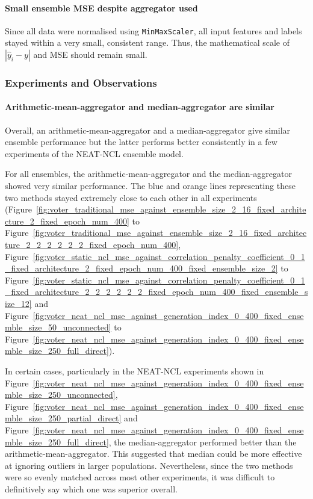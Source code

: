 \paragraph{Small ensemble MSE despite aggregator used}
Since all data were normalised using \texttt{MinMaxScaler}, all input features and labels stayed within a very small, consistent range. Thus, the mathematical scale of $\left|\hat{y}_i - y\right|$ and MSE should remain small. 


\subsubsection{Experiments and Observations}
\label{subsubsec:evaluation_voter_observations}
\paragraph{Arithmetic-mean-aggregator and median-aggregator are similar}
Overall, an arithmetic-mean-aggregator and a median-aggregator give similar ensemble performance but the latter performs better consistently in a few experiments of the NEAT-NCL ensemble model. 

For all ensembles, the arithmetic-mean-aggregator and the median-aggregator showed very similar performance. The blue and orange lines representing these two methods stayed extremely close to each other in all experiments (Figure~\ref{fig:voter_traditional_mse_against_ensemble_size_2_16_fixed_architecture_2_fixed_epoch_num_400} to Figure~\ref{fig:voter_traditional_mse_against_ensemble_size_2_16_fixed_architecture_2_2_2_2_2_2_fixed_epoch_num_400}, Figure~\ref{fig:voter_static_ncl_mse_against_correlation_penalty_coefficient_0_1_fixed_architecture_2_fixed_epoch_num_400_fixed_ensemble_size_2} to Figure~\ref{fig:voter_static_ncl_mse_against_correlation_penalty_coefficient_0_1_fixed_architecture_2_2_2_2_2_2_fixed_epoch_num_400_fixed_ensemble_size_12} and Figure~\ref{fig:voter_neat_ncl_mse_against_generation_index_0_400_fixed_ensemble_size_50_unconnected} to Figure~\ref{fig:voter_neat_ncl_mse_against_generation_index_0_400_fixed_ensemble_size_250_full_direct}). 

In certain cases, particularly in the NEAT-NCL experiments shown in Figure~\ref{fig:voter_neat_ncl_mse_against_generation_index_0_400_fixed_ensemble_size_250_unconnected}, Figure~\ref{fig:voter_neat_ncl_mse_against_generation_index_0_400_fixed_ensemble_size_250_partial_direct} and Figure~\ref{fig:voter_neat_ncl_mse_against_generation_index_0_400_fixed_ensemble_size_250_full_direct}, the median-aggregator performed better than the arithmetic-mean-aggregator. This suggested that median could be more effective at ignoring outliers in larger populations. Nevertheless, since the two methods were so evenly matched across most other experiments, it was difficult to definitively say which one was superior overall. 

